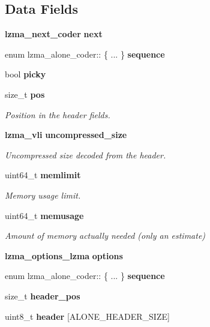 \subsection*{Data Fields}
\begin{DoxyCompactItemize}
\item 
\mbox{\label{structlzma__alone__coder_a6000aae3e9d15548a7b0370413fb4f5f}} 
\textbf{ lzma\+\_\+next\+\_\+coder} {\bfseries next}
\item 
\mbox{\label{structlzma__alone__coder_a0ea0e22742353642ca4b0e790eb5942b}} 
enum lzma\+\_\+alone\+\_\+coder\+:: \{ ... \}  {\bfseries sequence}
\item 
bool \textbf{ picky}
\item 
size\+\_\+t \textbf{ pos}
\begin{DoxyCompactList}\small\item\em Position in the header fields. \end{DoxyCompactList}\item 
\textbf{ lzma\+\_\+vli} \textbf{ uncompressed\+\_\+size}
\begin{DoxyCompactList}\small\item\em Uncompressed size decoded from the header. \end{DoxyCompactList}\item 
uint64\+\_\+t \textbf{ memlimit}
\begin{DoxyCompactList}\small\item\em Memory usage limit. \end{DoxyCompactList}\item 
uint64\+\_\+t \textbf{ memusage}
\begin{DoxyCompactList}\small\item\em Amount of memory actually needed (only an estimate) \end{DoxyCompactList}\item 
\textbf{ lzma\+\_\+options\+\_\+lzma} \textbf{ options}
\item 
\mbox{\label{structlzma__alone__coder_a988c280b605c469dfab0f1312c963c1c}} 
enum lzma\+\_\+alone\+\_\+coder\+:: \{ ... \}  {\bfseries sequence}
\item 
\mbox{\label{structlzma__alone__coder_a3f5e24f3d974c863fb4c55bf0bb2f257}} 
size\+\_\+t {\bfseries header\+\_\+pos}
\item 
\mbox{\label{structlzma__alone__coder_aabb278d903d0c368f7b0626b7759b64c}} 
uint8\+\_\+t {\bfseries header} [A\+L\+O\+N\+E\+\_\+\+H\+E\+A\+D\+E\+R\+\_\+\+S\+I\+ZE]
\end{DoxyCompactItemize}


